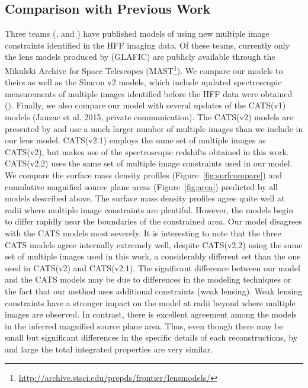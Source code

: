 \subsection{Comparison with Previous Work}
\label{sec:compare}

Three teams (\citealp{2014arXiv1409.8663J}, \citealp{2014ApJ...797...98L} and
\citealp{Ish++15}) have published models of \cler using new multiple
image constraints identified in the HFF imaging data. Of these teams,
currently only the lens models produced by \citealp{Ish++15} (GLAFIC) are
publicly available through the Mikulski Archive for Space Telescopes
(MAST\footnote{\url{http://archive.stsci.edu/prepds/frontier/lensmodels/}}). We
compare our models to theirs as well as the Sharon v2 models, which
include updated spectroscopic measurements of multiple images
identified before the HFF data were obtained (\citealp{Joh++14}). Finally, we also compare our model with 
several updates of the CATS(v1) models (Jauzac et al. 2015, private
communication). The CATS(v2) models are presented by \citet{2014arXiv1409.8663J} and use a much larger number of multiple images than we include in our lens model. CATS(v2.1) employs the same set of multiple images as CATS(v2), but makes use of the spectroscopic redshifts obtained in this work. CATS(v2.2) uses the same set of multiple image constraints used in our model. We compare the surface mass density
profiles (Figure~\ref{fig:surfcompare}) and cumulative magnified source plane areas
(Figure~\ref{fig:area}) predicted by all models described above. The surface mass density profiles agree quite
well at radii where multiple image constraints are plentiful. However,
the models begin to differ rapidly near the boundaries of the
constrained area. Our model disagrees with the CATS models most severely. It is interesting to note that the three CATS models agree internally extremely well, despite CATS(v2.2) using the same set of multiple images used in this work, a considerably different set than the one used in CATS(v2) and CATS(v2.1). The significant difference between our model and the CATS models may be due to differences in the modeling techniques or the fact that our method uses additional constraints (weak lensing). Weak lensing constraints have a stronger impact on the model at radii beyond where multiple images are observed. In contrast, there is excellent agreement among the
models in the inferred magnified source plane area. Thus, even though
there may be small but significant differences in the specific details
of each reconstructions, by and large the total integrated properties
are very similar. 

